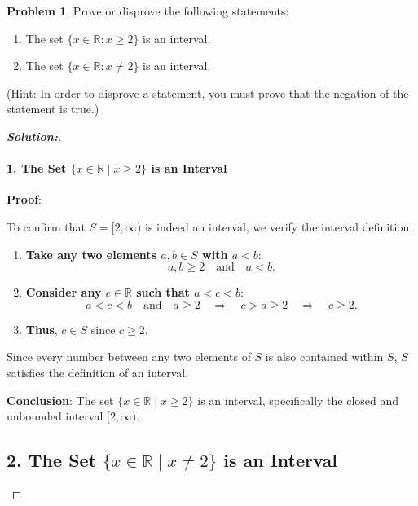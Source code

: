 \documentclass[12pt]{article}
\theoremstyle{definition}\newtheorem{problem}{Problem}
\newenvironment{solution}{\begin{proof}[\bfseries\textup{Solution:}]}{\end{proof}}
\newcommand{\R}{\mathbb{R}}
\begin{document}
\newpage
\begin{problem}
Prove or disprove the following statements:
\begin{enumerate}
\item The set $\{ x\in\R : x\geq 2 \}$ is an interval.
\item The set $\{ x\in\R : x\neq 2 \}$ is an interval.
\end{enumerate}
(Hint:  In order to disprove a statement, you must prove that the negation of the statement is true.)
\end{problem}
\begin{solution}

    \paragraph{1. The Set \( \{ x \in \mathbb{R} \mid x \geq 2 \} \) is an Interval}
    
    \textbf{Proof}:
   
    To confirm that \( S = [2, \infty) \) is indeed an interval, we verify the interval definition.
    
    \begin{enumerate}
        \item \textbf{Take any two elements \( a, b \in S \) with \( a < b \)}:
        \[
        a, b \geq 2 \quad \text{and} \quad a < b.
        \]
        
        \item \textbf{Consider any \( c \in \mathbb{R} \) such that \( a < c < b \)}:
        \[
        a < c < b \quad \text{and} \quad a \geq 2 \quad \Rightarrow \quad c > a \geq 2 \quad \Rightarrow \quad c \geq 2.
        \]
        
        \item \textbf{Thus}, \( c \in S \) since \( c \geq 2 \).
    \end{enumerate}
    
    Since every number between any two elements of \( S \) is also contained within \( S \), \( S \) satisfies the definition of an interval.
    
    \textbf{Conclusion}: The set \( \{ x \in \mathbb{R} \mid x \geq 2 \} \) is an interval, specifically the closed and unbounded interval \( [2, \infty) \).
    
    \subsection*{2. The Set \( \{ x \in \mathbb{R} \mid x \neq 2 \} \) is an Interval}
    

\end{solution}
\end{document}
